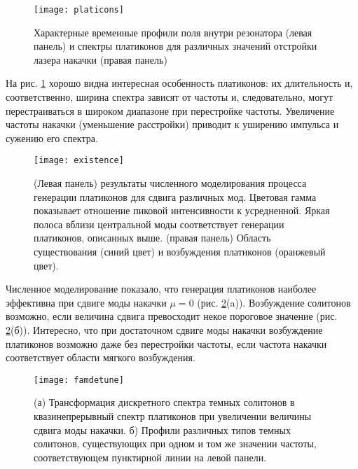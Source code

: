 \begin{figure}
  \centering
  \texttt{[image: platicons]}
  \caption{Характерные временные профили поля внутри резонатора (левая панель) и спектры платиконов для различных значений отстройки лазера накачки (правая панель)} \label{platicons}
\end{figure}


На рис. \ref{platicons} хорошо видна интересная особенность платиконов: их длительность и, соответственно, ширина спектра зависят от частоты и, следовательно, могут перестраиваться в широком диапазоне при перестройке частоты. Увеличение частоты накачки (уменьшение расстройки) приводит к уширению импульса и сужению его спектра.

\begin{figure}
  \centering
  \texttt{[image: existence]}
  \caption{(Левая панель) результаты численного моделирования процесса генерации платиконов для сдвига различных мод. Цветовая гамма показывает отношение пиковой интенсивности к усредненной. Яркая полоса вблизи центральной моды соответствует генерации платиконов, описанных выше. (правая панель) Область существования (синий цвет) и возбуждения платиконов (оранжевый цвет).} \label{platicons_existence}
\end{figure}

Численное моделирование показало, что генерация платиконов наиболее эффективна при сдвиге моды накачки $\mu=0$ (рис. \ref{platicons_existence}(a)). Возбуждение солитонов возможно, если величина сдвига превосходит некое пороговое значение (рис. \ref{platicons_existence}(б)). Интересно, что при достаточном сдвиге моды накачки возбуждение платиконов возможно даже без перестройки частоты, если частота накачки соответствует области мягкого возбуждения.

\begin{figure}
  \centering
  \texttt{[image: famdetune]}
  \caption{(а) Трансформация дискретного спектра темных солитонов в квазинепрерывный спектр платиконов при увеличении величины сдвига моды накачки. б) Профили различных типов темных солитонов, существующих при одном и том же значении частоты, соответствующем пунктирной линии на левой панели.} \label{platicons_famdetune}
\end{figure}


